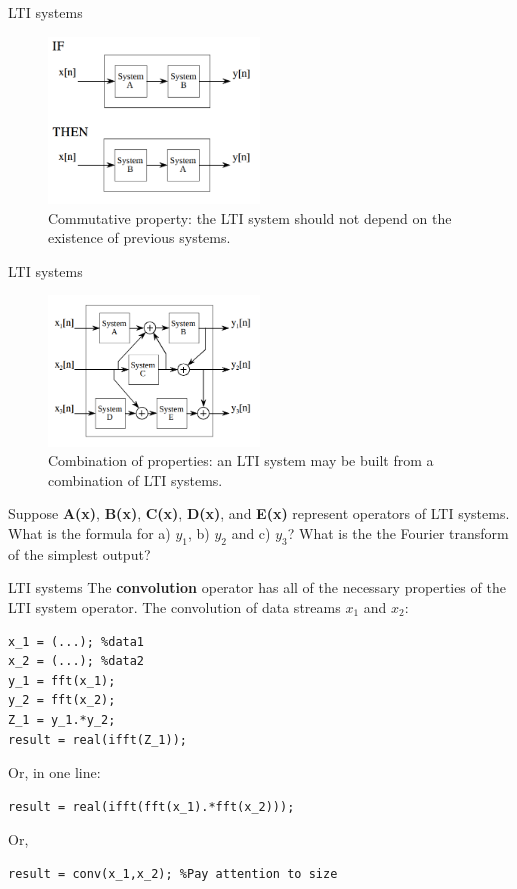 \documentclass{beamer}
\begin{document}
\begin{frame}{LTI systems}
\begin{figure}
\centering
\includegraphics[width=0.5\textwidth]{figures/LTI6.png}
\caption{\label{fig:LTI6} Commutative property: the LTI system should not depend on the existence of previous systems.}
\end{figure}
\end{frame}

\begin{frame}{LTI systems}
\small
\begin{figure}
\centering
\includegraphics[width=0.5\textwidth]{figures/LTI7.png}
\caption{\label{fig:LTI7} Combination of properties: an LTI system may be built from a combination of LTI systems.}
\end{figure}
Suppose \textbf{A(x)}, \textbf{B(x)}, \textbf{C(x)}, \textbf{D(x)}, and \textbf{E(x)} represent \alert{operators} of LTI systems.  What is the formula for a) $y_1$, b) $y_2$ and c) $y_3$?  What is the the Fourier transform of the simplest output?
\end{frame}

\begin{frame}[fragile]{LTI systems}
\small
The \textbf{convolution} operator has all of the necessary properties of the LTI system operator.  The convolution of data streams $x_1$ and $x_2$:
\begin{verbatim}
x_1 = (...); %data1
x_2 = (...); %data2
y_1 = fft(x_1);
y_2 = fft(x_2);
Z_1 = y_1.*y_2;
result = real(ifft(Z_1));
\end{verbatim}
Or, in one line:
\begin{verbatim}
result = real(ifft(fft(x_1).*fft(x_2)));
\end{verbatim}
Or,
\begin{verbatim}
result = conv(x_1,x_2); %Pay attention to size
\end{verbatim}
\end{frame}
\end{document}
